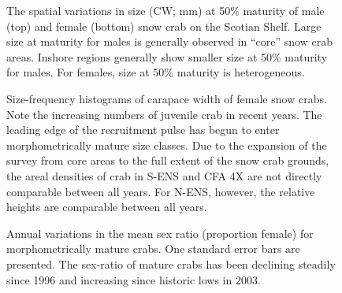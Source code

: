 \documentclass[11pt]{article}
\newcommand*{\D}{.}  %
\begin{document}
\begin{figure}[ht]
\begin{center}
\end{center}
\caption{The spatial variations in size (CW; mm) at 50\% maturity of male (top) and female (bottom) snow crab on the Scotian Shelf. Large size at maturity for males is generally observed in ``core'' snow crab areas. Inshore regions generally show smaller size at 50\% maturity for males.  For females, size at 50\% maturity is heterogeneous.}
\label{map.maturity}
\end{figure}



\clearpage \newpage
\begin{figure}[ht]
\begin{center}
\end{center}
\caption{Size-frequency histograms of carapace width of female snow crabs. Note the increasing numbers of juvenile crab in recent years. The leading edge of the recruitment pulse has begun to enter morphometrically mature size classes. Due to the expansion of the survey from core areas to the full extent of the snow crab grounds, the areal densities of crab in S-ENS and CFA 4X are not directly comparable between all years. For N-ENS, however, the relative heights are comparable between all years.}
\label{hist.female.cw}
\end{figure}


\begin{figure}[ht]
\begin{center}
\end{center}
\caption{Annual variations in the mean sex ratio (proportion female) for morphometrically mature crabs. One standard error bars are presented. The sex-ratio of mature crabs has been declining steadily since 1996 and increasing since historic lows in 2003.}
\label{ts.sex.ratio.mature}
\end{figure}
\end{document}
